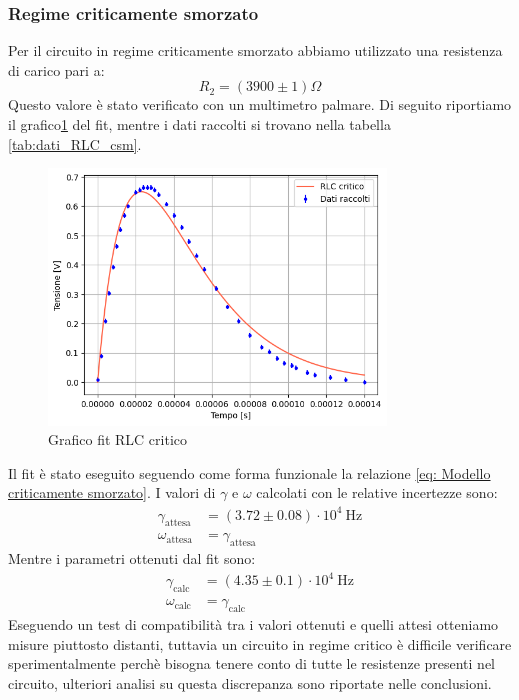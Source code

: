 \documentclass[letterpaper,12pt]{article}
\begin{document}
\newpage

\subsubsection{Regime criticamente smorzato}
Per il circuito in regime  criticamente smorzato abbiamo utilizzato una resistenza di carico pari a: $$R_2 =(3900\pm1) \Omega $$
Questo valore è stato verificato con un multimetro palmare. Di seguito riportiamo il grafico\ref{fig:fitRLCcritic} del fit, mentre i dati raccolti si trovano nella tabella \ref{tab:dati_RLC_csm}. 
\begin{figure}[h!] 
  \centering
  \includegraphics[width=0.8\textwidth]{RLCcritic.png} %
  \caption{Grafico fit RLC critico}
  \label{fig:fitRLCcritic}
\end{figure}

Il fit è stato eseguito seguendo come forma funzionale la relazione \eqref{eq: Modello criticamente smorzato}.
I valori di $\gamma$ e $\omega$ calcolati con le relative incertezze sono:
\begin{align*}
    \gamma_\text{attesa} & = (3.72 \pm 0.08) \cdot 10^4\ \text{Hz} \\
    \omega_\text{attesa} & = \gamma_\text{attesa}
\end{align*}
Mentre i parametri ottenuti dal fit sono:
\begin{align*}
    \gamma_\text{calc} & = (4.35 \pm 0.1) \cdot 10^4\ \text{Hz} \\
    \omega_\text{calc} & = \gamma_\text{calc}
\end{align*}
Eseguendo un test di compatibilità tra i valori ottenuti e quelli attesi otteniamo misure piuttosto distanti, tuttavia un circuito in regime critico è difficile verificare sperimentalmente perchè bisogna tenere conto di tutte le resistenze presenti nel circuito, ulteriori analisi su questa discrepanza sono riportate nelle conclusioni.
\end{document}
